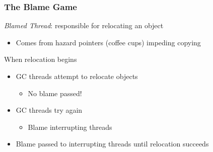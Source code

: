 \documentclass{beamer}
\newcommand{\linespace}{\vskip 0.25cm}
\begin{document}
\begin{frame}

\frametitle{The Blame Game}


\emph{Blamed Thread}: responsible for relocating an object
\begin{itemize}
\item Comes from hazard pointers (coffee cups) impeding copying
\end{itemize}

\linespace
\linespace

When relocation begins
\begin{itemize}
\item GC threads attempt to relocate objects
\begin{itemize}
\item No blame passed!
\end{itemize}
\item GC threads try again
\begin{itemize}
\item Blame interrupting threads
\end{itemize}
\item Blame passed to interrupting threads until relocation succeeds
\end{itemize}

\end{frame}
\end{document}
